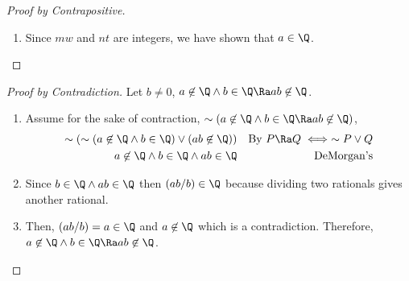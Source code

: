 \documentclass{homework}
\begin{document}
\begin{proof}[Proof by Contrapositive]
\begin{enumerate}
\begin{align*}
                  a & = a \times \frac{b}{b}                                      \\
                  a & = \frac{ab}{b}                                              \\
                  a & = \frac{m}{n} \times \frac{w}{t}                            \\
                  a & = \frac{mw}{nt}                                             \\
              \end{align*}
        \item Since $mw$ and $nt$ are integers, we have shown that $a \in \Q$. \qedhere
    \end{enumerate}
\end{proof}

\begin{proof}[Proof by Contradiction] Let $b\neq0$, $a \not \in \Q \wedge b \in \Q \Ra ab \not \in \Q$.
    \begin{enumerate}
        \item Assume for the sake of contraction, $\sim(a \not \in \Q \wedge b \in \Q \Ra ab \not \in \Q)$,
              \begin{align*}
                  \sim(\sim(a \not \in \Q \wedge b \in \Q) \vee (ab \not \in \Q)) &  & \text{By } P \Ra Q \iff \sim P\vee Q \\
                  a \not \in \Q \wedge b \in \Q \wedge ab \in \Q                  &  & \text{DeMorgan's}                    \\
              \end{align*}
        \item Since $b \in \Q \wedge ab \in \Q$ then $(ab/b)\in \Q$ because dividing two rationals gives another rational.
        \item Then, $(ab/b)=a\in \Q$ and $a \not \in \Q$ which is a contradiction. Therefore, $a \not \in \Q \wedge b \in \Q \Ra ab \not \in \Q$. \qedhere
    \end{enumerate}
\end{proof}
\end{document}

